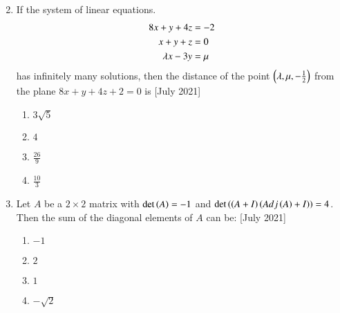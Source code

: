 \documentclass[journal]{IEEEtran}
\begin{document}
\begin{enumerate}
\begin{multicols}{2}
     \end{multicols}
     \item If the system of linear equations.
     \begin{align}
         8x+y+4z &= -2         \notag\\ 
         x+y+z &= 0             \notag\\
         \lambda x-3y &= \mu     \notag
     \end{align}
     has infinitely many solutions, then the distance of the point $\left(\lambda,\mu,-\frac{1}{2}\right)$ from the plane $8x +y+4z+2=0$ is \hfill{[July 2021]}
     \begin{multicols}{2}
     \begin{enumerate}
         \item $3\sqrt{5}$
         \item $4$
         \item $\frac{26}{9}$
         \item $\frac{10}{3}$
     \end{enumerate}
        \end{multicols}
    \item Let $A$ be a $2 \times 2$ matrix with $\det\left(A\right)= -1$ and $\det\left(\left(A+I\right)\left(Adj\left(A\right)+I\right)\right) = 4$. Then the sum of the diagonal elements of $A$ can be: \hfill{[July 2021]}
    \begin{multicols}{2}
        \begin{enumerate}
            \item $-1$
            \item $2$
            \item $1$
            \item $-\sqrt{2}$
            

\end{enumerate}
\end{multicols}
\end{enumerate}
\end{document}
